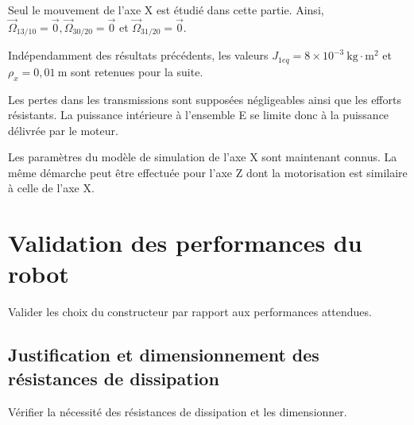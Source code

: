 Seul le mouvement de l'axe X est étudié dans cette partie. Ainsi, $\vec{\Omega}_{13 / 10}=\overrightarrow{0}, \vec{\Omega}_{30 / 20}=\overrightarrow{0}$ et $\vec{\Omega}_{31 / 20}=\overrightarrow{0}$.


Indépendamment des résultats précédents, les valeurs $J_{1 e q}=8 \times 10^{-3} \mathrm{~kg} \cdot \mathrm{m}^{2}$ et $\rho_{x}=0,01 \mathrm{~m}$ sont retenues pour la suite.

Les pertes dans les transmissions sont supposées négligeables ainsi que les efforts résistants. La puissance intérieure à l'ensemble E se limite donc à la puissance délivrée par le moteur.


Les paramètres du modèle de simulation de l'axe X sont maintenant connus. La même démarche peut être effectuée pour l'axe Z dont la motorisation est similaire à celle de l'axe X.

\section{Validation des performances du robot}
\begin{obj}
Valider les choix du constructeur par rapport aux performances attendues.
\end{obj}

\subsection{Justification et dimensionnement des résistances de dissipation}
\begin{obj}
Vérifier la nécessité des résistances de dissipation et les dimensionner.
\end{obj}

